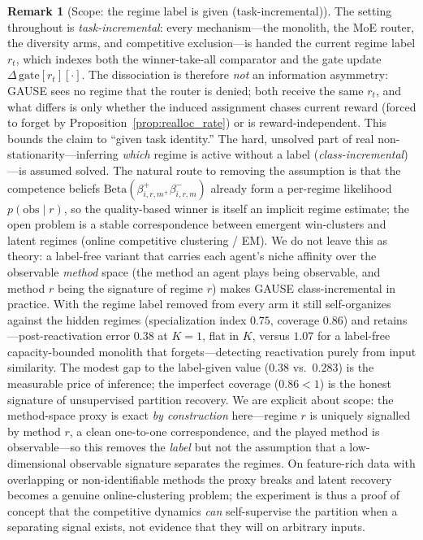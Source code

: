 \documentclass[11pt,a4paper]{article}
\theoremstyle{definition}
\newtheorem{remark}{Remark}[section]
\theoremstyle{plain}
\begin{document}
\begin{remark}[Scope: the regime label is given (task-incremental)]
\label{rem:task_incremental}
The setting throughout is \emph{task-incremental}: every mechanism---the monolith,
the MoE router, the diversity arms, and competitive exclusion---is handed the
current regime label $r_t$, which indexes both the winner-take-all comparator and
the gate update $\Delta\,\mathrm{gate}[r_t][\cdot]$. The dissociation is therefore
\emph{not} an information asymmetry: GAUSE sees no regime that the router is denied;
both receive the same $r_t$, and what differs is only whether the induced assignment
chases current reward (forced to forget by Proposition~\ref{prop:realloc_rate}) or is
reward-independent. This bounds the claim to ``given task identity.'' The hard,
unsolved part of real non-stationarity---inferring \emph{which} regime is active
without a label (\emph{class-incremental})---is assumed solved. The natural route to
removing the assumption is that the competence beliefs $\mathrm{Beta}(\beta^+_{i,r,m},
\beta^-_{i,r,m})$ already form a per-regime likelihood $p(\text{obs}\mid r)$, so the
quality-based winner is itself an implicit regime estimate; the open problem is a
stable correspondence between emergent win-clusters and latent regimes (online
competitive clustering / EM). We do not leave this as theory: a label-free variant
that carries each agent's niche affinity over the observable \emph{method} space (the
method an agent plays being observable, and method $r$ being the signature of regime
$r$) makes GAUSE class-incremental in practice. With the regime label removed from
every arm it still self-organizes against the hidden regimes (specialization index
$0.75$, coverage $0.86$) and retains---post-reactivation error $0.38$ at $K{=}1$,
flat in $K$, versus $1.07$ for a label-free capacity-bounded monolith that
forgets---detecting reactivation purely from input similarity. The modest gap to the
label-given value ($0.38$ vs.\ $0.283$) is the measurable price of inference; the
imperfect coverage ($0.86<1$) is the honest signature of unsupervised partition
recovery. We are explicit about scope: the method-space proxy is exact \emph{by
construction} here---regime $r$ is uniquely signalled by method $r$, a clean
one-to-one correspondence, and the played method is observable---so this removes the
\emph{label} but not the assumption that a low-dimensional observable signature
separates the regimes. On feature-rich data with overlapping or non-identifiable
methods the proxy breaks and latent recovery becomes a genuine online-clustering
problem; the experiment is thus a proof of concept that the competitive dynamics
\emph{can} self-supervise the partition when a separating signal exists, not evidence
that they will on arbitrary inputs.
\end{remark}
\end{document}
